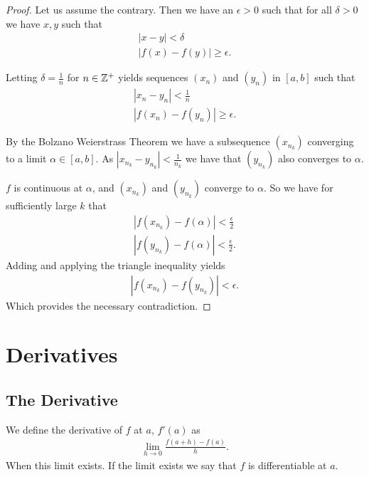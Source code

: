 \documentclass[]{article}
\begin{document}
\begin{proof}
	Let us assume the contrary. Then we have an $\epsilon > 0$ such that for all $\delta > 0$ we have $x, y$ such that
	\begin{align*}
		|x - y| < \delta \\
		|f(x) - f(y)| \geq \epsilon.
	\end{align*}

	Letting $\delta = \frac{1}{n}$ for $n \in \mathbb{Z}^+$ yields sequences $(x_n)$ and $(y_n)$ in $[a,b]$ such that
	\begin{align*}
			|x_n - y_n| < \frac{1}{n} \\
			|f(x_n) - f(y_n)| \geq \epsilon.
	\end{align*}

	By the Bolzano Weierstrass Theorem we have a subsequence $(x_{n_k})$ converging to a limit  $\alpha \in [a,b]$. As  $|x_{n_k} - y_{n_k}| < \frac{1}{n_k}$ we have that $(y_{n_k})$ also converges to $\alpha$.

	$f$ is continuous at $\alpha$, and $(x_{n_k})$ and $(y_{n_k})$ converge to $\alpha$. So we have for sufficiently large $k$ that 
	\begin{align*}
			|f(x_{n_k}) - f(\alpha)| < \frac{\epsilon}{2} \\
			|f(y_{n_k}) - f(\alpha)| < \frac{\epsilon}{2}.
	\end{align*}
	Adding and applying the triangle inequality yields
	\begin{align*}
			|f(x_{n_k}) - f(y_{n_k})| < \epsilon.
	\end{align*}
	Which provides the necessary contradiction.
\end{proof}

\section{Derivatives}

\subsection{The Derivative}

\begin{defi} [Derivative]
		We define the derivative of $f$ at $a$, $f'(a)$ as 
		\begin{align*}
				\lim_{h\to 0} \frac{f(a+h) - f(a)}{h}.
		\end{align*}
		When this limit exists. If the limit exists we say that $f$ is differentiable at $a$.
\end{defi}
\end{document}
